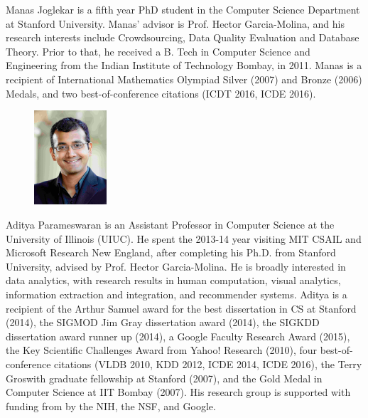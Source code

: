 \documentclass[10pt,journal,compsoc]{IEEEtran}
\begin{document}
Manas Joglekar is a fifth year PhD student in the Computer Science Department at Stanford University. Manas' advisor is Prof. Hector Garcia-Molina, and his research interests include Crowdsourcing, Data Quality Evaluation and Database Theory. Prior to that, he received a B. Tech in Computer Science and Engineering from the Indian Institute of Technology Bombay, in 2011.
Manas is a recipient of International Mathematics Olympiad Silver (2007) and Bronze (2006) Medals, and two best-of-conference citations (ICDT 2016, ICDE 2016).
\medskip


\begin{figure}
\includegraphics[height=3.5cm, width=2.7cm]{./figures/aditya.pdf}
\end{figure}
Aditya Parameswaran is an Assistant Professor in Computer Science at the University of Illinois (UIUC). He spent the 2013-14 year visiting MIT CSAIL and Microsoft Research New England, after completing his Ph.D. from Stanford University, advised by Prof. Hector Garcia-Molina. He is broadly interested in data analytics, with research results in human computation, visual analytics, information extraction and integration, and recommender systems. 
Aditya is a recipient of the Arthur Samuel award for the best dissertation in CS at Stanford (2014), the SIGMOD Jim Gray dissertation award (2014), the SIGKDD dissertation award runner up (2014), a Google Faculty Research Award (2015), the Key Scientific Challenges Award from Yahoo! Research (2010), four best-of-conference citations (VLDB 2010, KDD 2012, ICDE 2014, ICDE 2016), the Terry Groswith graduate fellowship at Stanford (2007), and the Gold Medal in Computer Science at IIT Bombay (2007). His research group is supported with funding from by the NIH, the NSF, and Google.

\medskip
\end{document}
